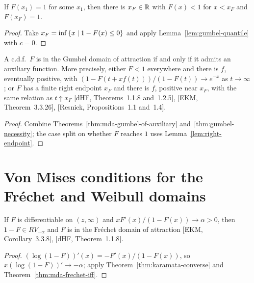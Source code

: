 \begin{lemma}
  \label{lem:right-endpoint}
  \leanok
  If $F(x_1) = 1$ for some $x_1$, then there is $x_F \in \mathbb{R}$ with $F(x) < 1$ for $x < x_F$ and
  $F(x_F) = 1$.
\end{lemma}
\begin{proof}
  \leanok
  Take $x_F = \inf \left\{  x \; | \; 1 - F(x) \le 0  \right\}$ and apply Lemma~\ref{lem:gumbel-quantile}
  with $c = 0$.
\end{proof}

\begin{theorem}
  \label{thm:mda-gumbel-iff}
  \leanok
  A c.d.f.\ $F$ is in the Gumbel domain of attraction if and only if it admits an auxiliary
  function. More precisely, either $F < 1$ everywhere and there is $f$, eventually positive, with
  $(1 - F(t + x f(t)))/(1 - F(t)) \to e^{-x}$ as $t \to \infty$; or $F$ has a finite right
  endpoint $x_F$ and there is $f$, positive near $x_F$, with the same relation as $t \uparrow x_F$
  [dHF, Theorems~1.1.8 and~1.2.5], [EKM, Theorem~3.3.26], [Resnick, Propositions~1.1 and~1.4].
\end{theorem}
\begin{proof}
  \leanok
  Combine Theorems~\ref{thm:mda-gumbel-of-auxiliary} and~\ref{thm:gumbel-necessity}; the case
  split on whether $F$ reaches $1$ uses Lemma~\ref{lem:right-endpoint}.
\end{proof}

\section{Von Mises conditions for the Fr\'echet and Weibull domains}

\begin{theorem}
  \label{thm:von-mises-frechet}
  \leanok
  If $F$ is differentiable on $(z, \infty)$ and $x F'(x)/(1 - F(x)) \to \alpha > 0$, then
  $1 - F \in RV_{-\alpha}$ and $F$ is in the Fr\'echet domain of attraction
  [EKM, Corollary~3.3.8], [dHF, Theorem~1.1.8].
\end{theorem}
\begin{proof}
  \leanok
  $(\log(1-F))'(x) = -F'(x)/(1-F(x))$, so $x (\log(1 - F))' \to -\alpha$; apply
  Theorem~\ref{thm:karamata-converse} and Theorem~\ref{thm:mda-frechet-iff}.
\end{proof}

